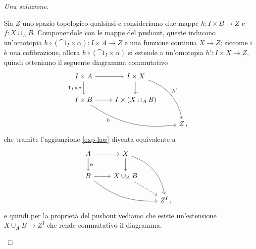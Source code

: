 \begin{exercise}
\begin{rmnumerate}
	\end{rmnumerate}
	\begin{proof}[Una soluzione]
		\begin{rmnumerate}
			\item Sia $Z$ uno spazio topologico qualsiasi e consideriamo
			due mappe $h:I \times B \to Z$ e $f : X \cup_{A} B$. 
			Componendole con le mappe del pushout,
			queste inducono un'omotopia $h \circ (\cat{1}_{I} \times \alpha): I \times A \to Z$
			e una funzione continua $X \to Z$; siccome $i$ è una cofibrazione,
			allora $h \circ (\cat{1}_{I} \times \alpha)$ si estende a un'omotopia
			$h':I \times X \to Z$, quindi otteniamo il seguente diagramma commutativo
			\begin{equation*}
				\begin{tikzcd}
					I \times A \ar[r] \ar[d, "\cat{1}_{I} \times \alpha"'] 
					& I \times X \ar[d] \ar[ddr, bend left, "h'"] & \\
					I \times B \ar[r] \ar[rrd,  bend right=20pt, "h"', near start] 
					& I \times \left(X \cup_{A} B\right) & \\
					& & Z\,,
				\end{tikzcd}
			\end{equation*}
			che tramite l'aggiunzione \eqref{exp-law} diventa equivalente a
			\begin{equation*}
				\begin{tikzcd}
					A \ar[r] \ar[d, "\alpha"] 
					& X \ar[d] \ar[ddr, bend left] & \\
					B \ar[r] \ar[rrd,  bend right=20pt] 
					& X \cup_{A} B \ar[dr, dashed] & \\
					& & Z^{I} \,,
				\end{tikzcd}
			\end{equation*}
			e quindi per la proprietà del pushout vediamo che esiste un'estensione
			$X \cup_{A} B \to Z^{I}$ che rende commutativo il diagramma.
			

\end{rmnumerate}
\end{proof}
\end{exercise}
